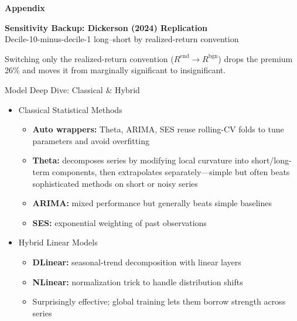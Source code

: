 \documentclass[ignorenonframetext, 9pt]{beamer}
\begin{document}
\appendix
\begin{frame}
  \centering
  \textbf{Appendix}
\end{frame}

\begin{frame}[plain]
  \tiny
  \centering
  \textbf{Sensitivity Backup: Dickerson (2024) Replication}\\
  {\scriptsize Decile-10-minus-decile-1 long--short by realized-return convention}\\
  \vspace{0.3cm}
  \resizebox{0.8\textwidth}{!}{}

  \vspace{0.3cm}
  \scriptsize Switching only the realized-return convention ($R^{\text{end}}\to R^{\text{bgn}}$) drops the premium 26\% and moves it from marginally significant to insignificant.
\end{frame}


\begin{frame}{Model Deep Dive: Classical \& Hybrid}
\begin{itemize}
    \item \alert{Classical Statistical Methods}
    \begin{itemize}
        \item \textbf{Auto wrappers:} Theta, ARIMA, SES reuse rolling-CV folds to tune parameters and avoid overfitting
        \item \textbf{Theta:} decomposes series by modifying local curvature into short/long-term components, then extrapolates separately---simple but often beats sophisticated methods on short or noisy series
        \item \textbf{ARIMA:} mixed performance but generally beats simple baselines
        \item \textbf{SES:} exponential weighting of past observations
    \end{itemize}
    \vspace{0.3cm}
    \item \alert{Hybrid Linear Models}
    \begin{itemize}
        \item \textbf{DLinear:} seasonal-trend decomposition with linear layers
        \item \textbf{NLinear:} normalization trick to handle distribution shifts
        \item Surprisingly effective; global training lets them borrow strength across series
    \end{itemize}
\end{itemize}
\end{frame}
\end{document}

